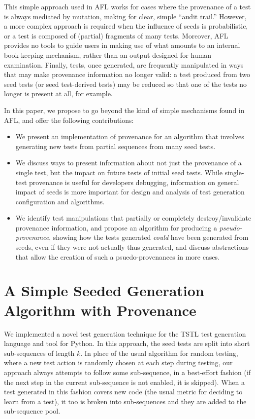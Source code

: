 \documentclass[final]{article}
\begin{document}
This simple approach used in AFL works for cases where the provenance of a test is
always mediated by mutation, making for clear, simple ``audit trail.''  However, a more complex approach is
required when the influence of seeds is probabilistic, or a test is
composed of (partial) fragments of many tests.  Moreover, AFL provides
no tools to guide users in making use of what amounts to an internal
book-keeping mechanism, rather than an output designed for human
examination.
Finally, tests, once generated, are frequently manipulated in ways
that may make provenance information no longer valid:  a test produced
from two seed tests (or seed test-derived tests) may be reduced
\cite{DD} so that one of the tests no longer is present at all, for example.

In this paper, we propose to go beyond the kind of simple mechanisms
found in AFL, and
offer the following contributions:

\begin{itemize}
\item We present an implementation of provenance for an algorithm that involves
  generating new tests from partial sequences from many seed tests.
\item We discuss ways to present information about not just the
  provenance of a single test, but the impact on future tests of
  initial seed tests.  While single-test provenance is useful for
  developers debugging, information on general impact of seeds is more
  important for design and analysis of test generation configuration
  and algorithms.
\item We identify test manipulations that partially or completely
  destroy/invalidate provenance information, and propose an algorithm
  for producing a \emph{pseudo-provenance}, showing how the tests generated
  \emph{could} have been generated from seeds, even if they were not actually
  thus generated, and discuss abstractions that allow the
  creation of such a psuedo-provenances in more cases.
\end{itemize}

\section{A Simple Seeded Generation Algorithm with Provenance}

We implemented a novel test generation technique for the TSTL
\cite{tstlsttt,nfm15,issta15} test generation language and tool for
Python.  In this approach, the seed tests are split into short
sub-sequences of length $k$.  In place of the usual algorithm for
random testing, where a new test action is randomly chosen at each
step during testing, our approach always attempts to follow some
sub-sequence, in a best-effort fashion (if the next step in the
current sub-sequence is not enabled, it is skipped).  When a test
generated in this fashion covers new code (the usual metric for
deciding to learn from a test), it too is broken into sub-sequences
and they are added to the sub-sequence pool.
\end{document}
